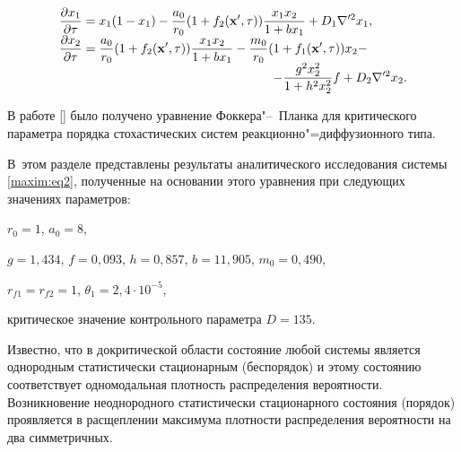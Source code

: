 \begin{equation}

\label{maxim:eq2}

\begin{array}{l}

\displaystyle

 {\frac{{\partial x_{1}}} {{\partial \tau}} } = x_{1} (1 - x_{1} ) - {\frac{{a_{0}}} {{r_{0}}} }(1 + f_{2} ({\rm {\bf {x}'}},\tau )){\frac{{x_{1}x_{2}}} {{1 + bx_{1}}} } + D_{1} {\nabla} '^{2}x_{1}, \\

 \displaystyle

 {\frac{{\partial x_{2}}} {{\partial \tau}} } = {\frac{{a_{0}}} {{r_{0}}} }(1 + f_{2} ({\rm {\bf {x}'}},\tau )){\frac{{x_{1}x_{2}}} {{1 + bx_{1}}}} - {\frac{{m_{0}}} {{r_{0}}} }(1 + f_{1} ({\rm {\bf {x}'}},\tau ))x_{2} - \\ 

 \displaystyle \hspace{6cm}

 -   {\frac{{g^{2}x_{2}^{2}}} {{1 + h^{2}x_{2}^{2}}} }f +

D_{2} {\nabla} '^{2}x_{2}  .

 \end{array} 

\end{equation}








В работе  [] было получено уравнение Фоккера"--~Планка для критического параметра порядка стохастических систем реакционно"=диффузионного типа. 

В~этом разделе представлены результаты аналитического исследования системы \eqref{maxim:eq2}, полученные на основании этого уравнения при следующих значениях параметров:

$r_0=1$, $a_0=8$,

$g=1,434$, $f=0,093$, $h=0,857$, $b=11,905$, $ m_0=0,490$, 

$r_{f1}=r_{f2}=1$, $\theta_{1}=2,4\cdot 10^{- 5}$, 

критическое значение контрольного параметра  $D=135$.

Известно, что в докритической области состояние любой системы является однородным статистически стационарным (беспорядок) и этому состоянию соответствует одномодальная плотность распределения вероятности. Возникновение неоднородного статистически стационарного состояния (порядок) проявляется в расщеплении максимума плотности распределения вероятности на два симметричных.

